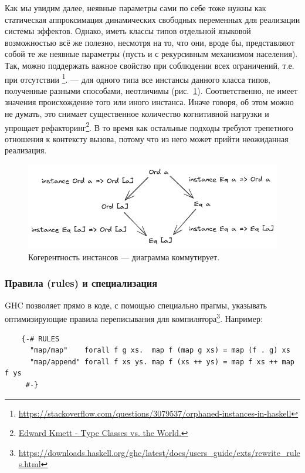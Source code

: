 Как мы увидим далее, неявные параметры сами по себе тоже нужны как статическая аппроксимация динамических свободных переменных для реализации системы эффектов. %
Однако, иметь классы типов отдельной языковой возможностью всё же полезно, несмотря на то, что они, вроде бы, представляют собой те же неявные параметры (пусть и с рекурсивным механизмом населения).
Так, можно поддержать важное свойство при соблюдении всех ограничений, т.е. при отсутствии \footnote{\url{https://stackoverflow.com/questions/3079537/orphaned-instances-in-haskell}}.
 --- для одного типа все инстансы данного класса типов, полученные разными способами, неотличимы (рис.~\ref{fig:coherence}).
Соответственно, не имеет значения происхождение того или иного инстанса.
Иначе говоря, об этом можно не думать, это снимает существенное количество когнитивной нагрузки и упрощает рефакторинг\footnote{\href{https://youtu.be/hIZxTQP1ifo?si=aG2Lk2eb-5E5SOLb}{Edward Kmett - Type Classes vs. the World.}}.
В то время как остальные подходы требуют трепетного отношения к контексту вызова, потому что из него может прийти неожиданная реализация.

\begin{figure}
    \centering
    \includegraphics[width=0.8\linewidth]{figs/coherence}
    \caption{Когерентность инстансов --- диаграмма коммутирует.}
    \label{fig:coherence}
\end{figure}

\subsubsection{Правила (rules) и специализация} \label{subsubsec:rules}

GHC позволяет прямо в коде, с помощью специально прагмы, указывать оптимизирующие правила переписывания для компилятора\footnote{\url{https://downloads.haskell.org/ghc/latest/docs/users_guide/exts/rewrite_rules.html}}.
Например:
\begin{verbatim}
    {-# RULES
      "map/map"    forall f g xs.  map f (map g xs) = map (f . g) xs
      "map/append" forall f xs ys. map f (xs ++ ys) = map f xs ++ map f ys
     #-}
\end{verbatim}

